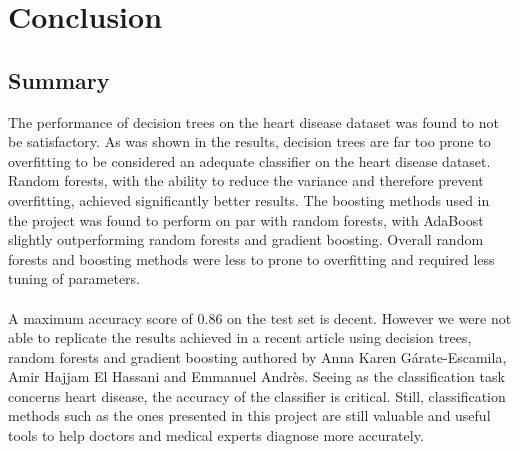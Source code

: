 \documentclass[a4paper,twocolumn]{article}
\begin{document}
\section{Conclusion}
\subsection{Summary}
The performance of decision trees on the heart disease dataset was found to not be satisfactory. As was shown in the results, decision trees are far too prone to overfitting to be considered an adequate classifier on the heart disease dataset. Random forests, with the ability to reduce the variance and therefore prevent overfitting, achieved significantly better results. The boosting methods used in the project was found to perform on par with random forests, with AdaBoost slightly outperforming random forests and gradient boosting. Overall random forests and boosting methods were less to prone to overfitting and required less tuning of parameters.\\
\\
A maximum accuracy score of $0.86$ on the test set is decent. However we were not able to replicate the results achieved in a recent article\cite{introarticle} using decision trees, random forests and gradient boosting authored by Anna Karen Gárate-Escamila, Amir Hajjam El Hassani and Emmanuel Andrès. Seeing as the classification task concerns heart disease, the accuracy of the classifier is critical. Still, classification methods such as the ones presented in this project are still valuable and useful tools to help doctors and medical experts diagnose more accurately.
\end{document}

